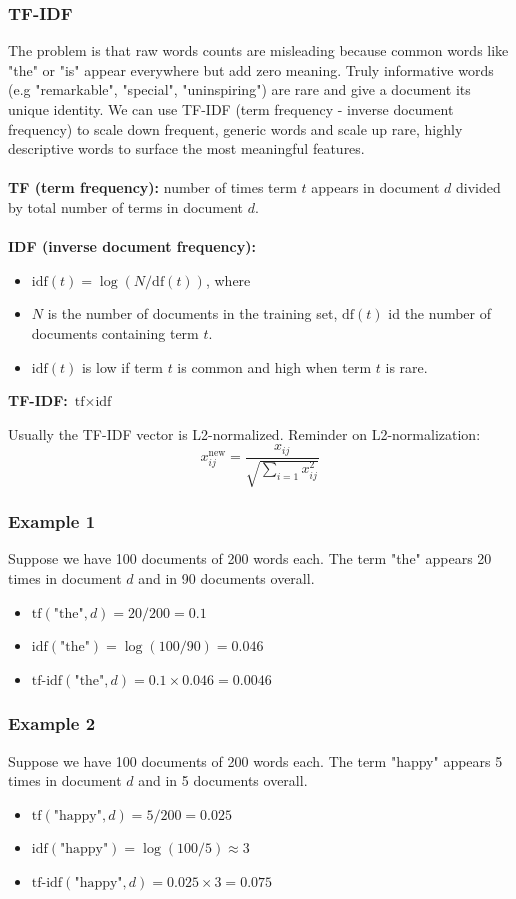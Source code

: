 \documentclass[11pt]{article}
\begin{document}
\subsubsection{TF-IDF}
The problem is that raw words counts are misleading because common words like "the" or "is" appear everywhere but add zero meaning. Truly informative words (e.g "remarkable", "special", "uninspiring") are rare and give a document its unique identity.
We can use TF-IDF (term frequency - inverse document frequency) to scale down frequent, generic words and scale up rare, highly descriptive words to surface the most meaningful features. \\\\
\textbf{TF (term frequency):} number of times term $t$ appears in document $d$ divided by total number of terms in document $d$. \\\\
\textbf{IDF (inverse document frequency):}\\
\begin{itemize}
    \item $\text{idf}(t)=\log(N/\text{df}(t))$, where
    \item $N$ is the number of documents in the training set, $\text{df}(t)$ id the number of documents containing term $t$.
    \item $\text{idf}(t)$ is low if term $t$ is common and high when term $t$ is rare.
\end{itemize}
\textbf{TF-IDF:} $\text{tf}\times\text{idf}$
\begin{note}[Extra]
Usually the TF-IDF vector is L2-normalized. Reminder on L2-normalization:
$$
x_{ij}^{\text{new}}=\frac{x_{ij}}{\sqrt{\sum_{i=1}x_{ij}^2}}
$$
\end{note}

\subsubsection{Example 1}
Suppose we have 100 documents of 200 words each. The term "the" appears 20 times in document $d$ and in 90 documents overall.
\begin{itemize}
    \item $\text{tf}(\text{"the"},d)=20/200=0.1$
    \item $\text{idf}(\text{"the"})=\log(100/90)=0.046$
    \item $\text{tf-idf}(\text{"the"},d)=0.1\times 0.046=0.0046$
\end{itemize}

\subsubsection{Example 2}
Suppose we have 100 documents of 200 words each. The term "happy" appears 5 times in document $d$ and in 5 documents overall.
\begin{itemize}
    \item $\text{tf}(\text{"happy"},d)=5/200=0.025$
    \item $\text{idf}(\text{"happy"})=\log(100/5)\approx 3$
    \item $\text{tf-idf}(\text{"happy"},d)=0.025\times 3=0.075$
\end{itemize}
\end{document}
